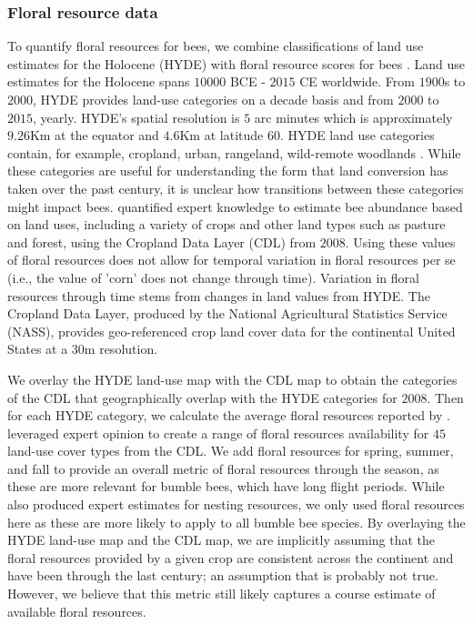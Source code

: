 \documentclass[12pt]{article}
\begin{document}
\subsubsection{Floral resource data}
To quantify floral resources for bees, we combine classifications of land use estimates for the Holocene (HYDE) \citep{klein2017anthropogenic} with floral resource scores for bees \citep{koh2016modeling}. Land use estimates for the Holocene spans $10000$ BCE - $2015$ CE worldwide. From $1900$s to $2000$, HYDE provides land-use categories on a decade basis and from $2000$ to $2015$, yearly. HYDE's spatial resolution is $5$ arc minutes which is approximately $9.26$Km at the equator and $4.6$Km at latitude $60$. HYDE land use categories contain, for example, cropland, urban, rangeland, wild-remote woodlands \citep{klein2017anthropogenic}. While these categories are useful for understanding the form that land conversion has taken over the past century, it is unclear how transitions between these categories might impact bees. \citet{koh2016modeling} quantified expert knowledge to estimate bee abundance based on land uses, including a variety of crops and other land types such as pasture and forest, using the Cropland Data Layer (CDL) from $2008$. Using these values of floral resources does not allow for temporal variation in floral resources per se (i.e., the value of 'corn' does not change through time). Variation in floral resources through time stems from changes in land values from HYDE. The Cropland Data Layer, produced by the National Agricultural Statistics Service (NASS), provides geo-referenced crop land cover data for the continental United States at a $30$m resolution.

We overlay the HYDE land-use map with the CDL map to obtain the categories of the CDL that geographically overlap with the HYDE categories for $2008$. Then for each HYDE category, we calculate the average floral resources reported by \citet{koh2016modeling}. \citet{koh2016modeling} leveraged expert opinion to create a range of floral resources availability for $45$ land-use cover types from the CDL. We add floral resources for spring, summer, and fall to provide an overall metric of floral resources through the season, as these are more relevant for bumble bees, which have long flight periods. While \citet{koh2016modeling} also produced expert estimates for nesting resources, we only used floral resources here as these are more likely to apply to all bumble bee species. By overlaying the HYDE land-use map and the CDL map, we are implicitly assuming that the floral resources provided by a given crop are consistent across the continent and have been through the last century; an assumption that is probably not true. However, we believe that this metric still likely captures a course estimate of available floral resources.
\end{document}
